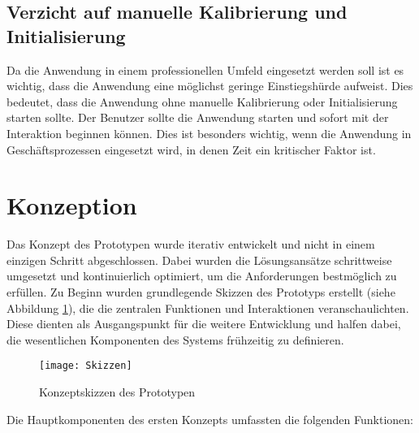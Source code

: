 \subsection{Verzicht auf manuelle Kalibrierung und Initialisierung}

Da die Anwendung in einem professionellen Umfeld eingesetzt werden soll ist es wichtig, dass die Anwendung eine möglichst geringe Einstiegshürde aufweist. Dies bedeutet, dass die Anwendung ohne manuelle Kalibrierung oder Initialisierung starten sollte. Der Benutzer sollte die Anwendung starten und sofort mit der Interaktion beginnen können. Dies ist besonders wichtig, wenn die Anwendung in Geschäftsprozessen eingesetzt wird, in denen Zeit ein kritischer Faktor ist.

\section{Konzeption}

Das Konzept des Prototypen wurde iterativ entwickelt und nicht in einem einzigen Schritt abgeschlossen. Dabei wurden die Lösungsansätze schrittweise umgesetzt und kontinuierlich optimiert, um die Anforderungen bestmöglich zu erfüllen. Zu Beginn wurden grundlegende Skizzen des Prototyps erstellt (siehe Abbildung \ref{fig:Concept}), die die zentralen Funktionen und Interaktionen veranschaulichten. Diese dienten als Ausgangspunkt für die weitere Entwicklung und halfen dabei, die wesentlichen Komponenten des Systems frühzeitig zu definieren.

\begin{figure}[ht]
    \centering
    \texttt{[image: Skizzen]}
    \caption{Konzeptskizzen des Prototypen}
    \label{fig:Concept}
\end{figure}

Die Hauptkomponenten des ersten Konzepts umfassten die folgenden Funktionen:

